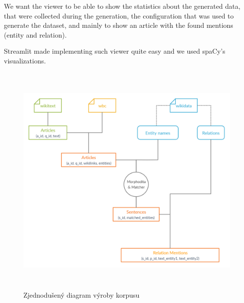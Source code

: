 We want the viewer to be able to show the statistics about the generated data, that were collected during the generation, the configuration that was used to generate the dataset, and mainly to show an article with the found mentions (entity and relation). 

Streamlit made implementing such viewer quite easy and we used spaCy’s  visualizations. 






\begin{figure}[p]\centering
\includegraphics[width=140mm, height=117mm]{./img/Corpus_diagram}
\caption{Zjednodušený diagram výroby korpusu}
\label{obr03:Nhust}
\end{figure}



